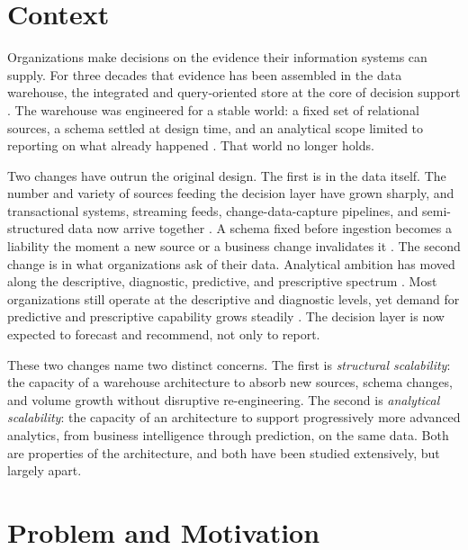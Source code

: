 
\section*{Context}
\label{sec:intro-context}

Organizations make decisions on the evidence their information systems can supply. For three decades that evidence has been assembled in the data warehouse, the integrated and query-oriented store at the core of decision support \parencite{inmon2005, kimball2013}. The warehouse was engineered for a stable world: a fixed set of relational sources, a schema settled at design time, and an analytical scope limited to reporting on what already happened \parencite{golfarelli2009}. That world no longer holds.

Two changes have outrun the original design. The first is in the data itself. The number and variety of sources feeding the decision layer have grown sharply, and transactional systems, streaming feeds, change-data-capture pipelines, and semi-structured data now arrive together \parencite{vassiliadis2009, deltalake2020}. A schema fixed before ingestion becomes a liability the moment a new source or a business change invalidates it \parencite{kleppmann2017}. The second change is in what organizations ask of their data. Analytical ambition has moved along the descriptive, diagnostic, predictive, and prescriptive spectrum \parencite{davenport2007}. Most organizations still operate at the descriptive and diagnostic levels, yet demand for predictive and prescriptive capability grows steadily \parencite{chen2012}. The decision layer is now expected to forecast and recommend, not only to report.

These two changes name two distinct concerns. The first is \textit{structural scalability}: the capacity of a warehouse architecture to absorb new sources, schema changes, and volume growth without disruptive re-engineering. The second is \textit{analytical scalability}: the capacity of an architecture to support progressively more advanced analytics, from business intelligence through prediction, on the same data. Both are properties of the architecture, and both have been studied extensively, but largely apart.

\section*{Problem and Motivation}
\label{sec:intro-problem}

